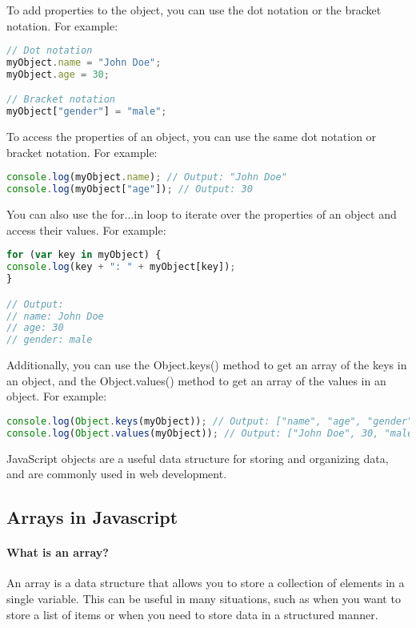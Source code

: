 {To add properties to the object, you can use the dot notation or the bracket notation. For example:
\begin{lstlisting}[language=Javascript, numbers=none, caption=Dot notiation in javascript]
// Dot notation
myObject.name = "John Doe";
myObject.age = 30;

// Bracket notation
myObject["gender"] = "male";
\end{lstlisting}

To access the properties of an object, you can use the same dot notation or bracket notation. For example:
\begin{lstlisting}[language=Javascript, nolol, numbers=none]
console.log(myObject.name); // Output: "John Doe"
console.log(myObject["age"]); // Output: 30
\end{lstlisting}

You can also use the for...in loop to iterate over the properties of an object and access their values. For example:
\begin{lstlisting}[language=Javascript, numbers=none]
for (var key in myObject) {
console.log(key + ": " + myObject[key]);
}

// Output:
// name: John Doe
// age: 30
// gender: male
\end{lstlisting}

Additionally, you can use the Object.keys() method to get an array of the keys in an object, and the Object.values() method to get an array of the values in an object. For example:
\begin{lstlisting}[language=Javascript, nolol]
console.log(Object.keys(myObject)); // Output: ["name", "age", "gender"]
console.log(Object.values(myObject)); // Output: ["John Doe", 30, "male"]
\end{lstlisting}

JavaScript objects are a useful data structure for storing and organizing data, and are commonly used in web development.


\subsection{Arrays in Javascript}

\paragraph{What is an array?}
An array is a data structure that allows you to store a collection of elements in a single variable. This can be useful in many situations, such as when you want to store a list of items or when you need to store data in a structured manner.

}
